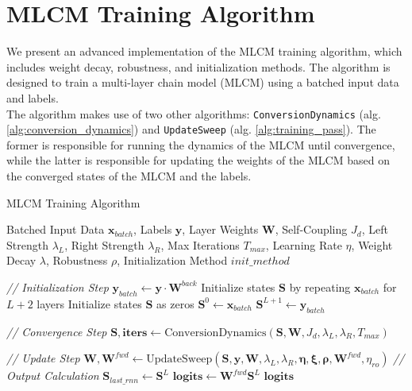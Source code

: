 \documentclass[a4paper,12pt]{report}
\begin{document}
\chapter{MLCM Training Algorithm}
\label{app:mlcm_training_algorithm}
We present an advanced implementation of the MLCM training algorithm, which includes 
weight decay, robustness, and initialization methods. The algorithm is designed to
train a multi-layer chain model (MLCM) using a batched input data and labels. \\
The algorithm makes use of two other algorithms: \texttt{ConversionDynamics} 
(alg. \ref{alg:conversion_dynamics}) and \texttt{UpdateSweep} (alg. \ref{alg:training_pass}).
The former is responsible for running the dynamics of the MLCM until convergence,
while the latter is responsible for updating the weights of the MLCM based on the
converged states of the MLCM and the labels. \\
\begin{algorithm}
\caption{MLCM Training Algorithm}
\label{alg:forward_mlmc}
\begin{algorithmic}[1]
\scriptsize
\Require Batched Input Data  $\mathbf{x}_{batch}$, Labels $\mathbf{y}$, 
Layer Weights $\mathbf{W}$, Self-Coupling $J_d$, Left Strength $\lambda_{L}$, 
Right Strength $\lambda_{R}$, Max Iterations $T_{max}$, Learning Rate $\eta$, 
Weight Decay $\lambda$, Robustness $\rho$, Initialization Method $init\_method$

\Statex
\Statex \textit{// Initialization Step}
\State $\mathbf{y}_{batch} \gets \mathbf{y} \cdot \mathbf{W}^{back}$
    \State Initialize states $\mathbf{S}$ by repeating $\mathbf{x}_{batch}$ for $L+2$ layers
    \State Initialize states $\mathbf{S}$ as zeros
\EndIf
\State $\mathbf{S}^0 \gets \mathbf{x}_{batch}$ 
\State $\mathbf{S}^{L+1} \gets \mathbf{y}_{batch}$ 

\Statex
\Statex \textit{// Convergence Step}
\State $\mathbf{S}, \mathbf{iters} \gets \text{ConversionDynamics}(\mathbf{S}, 
\mathbf{W}, J_d, \lambda_{L}, \lambda_{R}, T_{max})$
\label{line:call_conversion_dynamics}

\Statex
{}
    \Statex \textit{// Update Step}
    \label{line:call_update_sweep}
    \State $\mathbf{W}, \mathbf{W}^{fwd} \gets \text{UpdateSweep}(\mathbf{S}, 
    \mathbf{y}, \mathbf{W}, \lambda_{L}, \lambda_{R}, \mathbf{\eta}, \mathbf{\xi}, 
    \mathbf{\rho}, \mathbf{W}^{fwd}, \eta_{ro})$
\Else
    \Statex \textit{// Output Calculation}
    \State $\mathbf{S}_{last\_rnn} \gets \mathbf{S}^L$ 
    \State $\mathbf{logits} \gets \mathbf{W}^{fwd} \mathbf{S}^{L}$
    \State \Return $\mathbf{logits}$
\EndIf
\end{algorithmic}
\end{algorithm}
\end{document}
